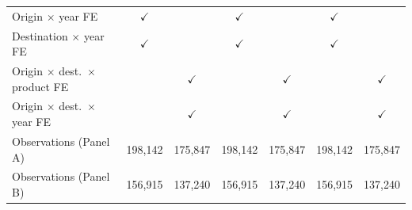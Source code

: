\begin{tabular}{lcccccc}
Origin $\times$ year FE & $\checkmark$ &  & $\checkmark$ &  & $\checkmark$ &  \\
Destination $\times$ year FE & $\checkmark$ &  & $\checkmark$ &  & $\checkmark$ &  \\
Origin $\times$ dest.\ $\times$ product FE &  & $\checkmark$ &  & $\checkmark$ &  & $\checkmark$ \\
Origin $\times$ dest.\ $\times$ year FE &  & $\checkmark$ &  & $\checkmark$ &  & $\checkmark$ \\
Observations (Panel A) & 198,142 & 175,847 & 198,142 & 175,847 & 198,142 & 175,847 \\
Observations (Panel B) & 156,915 & 137,240 & 156,915 & 137,240 & 156,915 & 137,240 \\
\hline
\end{tabular}
